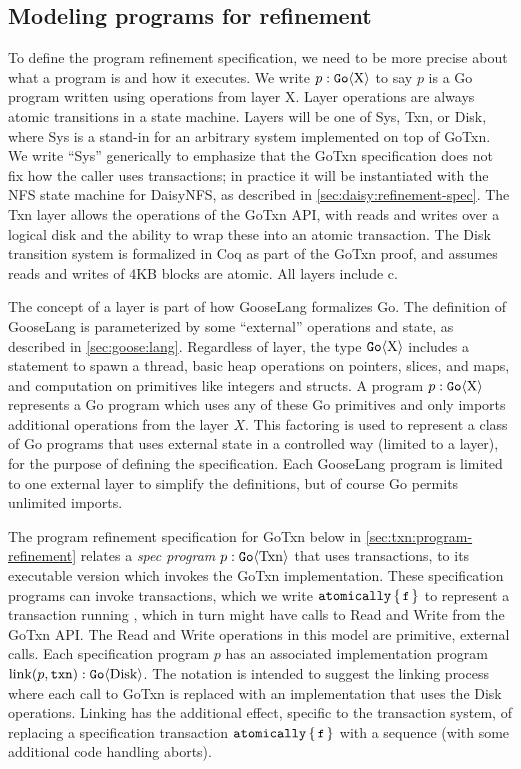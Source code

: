 \subsection{Modeling programs for refinement}%
\label{sec:txn:go-layers}

To define the program refinement specification, we need to be more precise about what a program is
and how it executes. We
write $p : \mathtt{Go}\langle \mathrm{X} \rangle$ to say $p$ is a Go program written using operations
from layer X.
Layer operations are always atomic transitions in a state machine. Layers will
be one of Sys, Txn, or Disk, where Sys is a
stand-in for an arbitrary system implemented on top of GoTxn. We write
``Sys'' generically to emphasize that the GoTxn specification does not fix how the
caller uses transactions; in practice it will be instantiated with the NFS state
machine for DaisyNFS, as described in \cref{sec:daisy:refinement-spec}.
The Txn layer allows the operations of the GoTxn API, with reads and writes over a logical
disk and the ability to wrap these into an atomic transaction. The
Disk transition system is formalized in Coq as part of the GoTxn proof,
and assumes reads and writes of 4KB blocks are atomic. All layers
include c.

The concept of a layer is part of how GooseLang formalizes Go. The definition of
GooseLang is parameterized by some ``external'' operations and state, as
described in \cref{sec:goose:lang}. Regardless of layer, the type
$\mathtt{Go}\langle \mathrm{X} \rangle$ includes a statement to spawn a thread, basic heap operations
on pointers, slices, and maps, and computation on primitives like integers and
structs. A program $p : \mathtt{Go}\langle \mathrm{X} \rangle$ represents a Go program which uses any
of these Go primitives and only imports additional operations from the layer
$X$. This factoring is used to represent a class of Go programs that uses
external state in a controlled way (limited to a layer), for the purpose of
defining the specification. Each GooseLang program is limited to one external
layer to simplify the definitions, but of course Go permits unlimited imports.

The program refinement specification for GoTxn below in
\cref{sec:txn:program-refinement} relates a \emph{spec program}
$p : \mathtt{Go}\langle \mathrm{Txn} \rangle$ that uses transactions, to its executable version
which invokes the GoTxn implementation. These specification programs can invoke
transactions, which we write $\atomically{\cc{f}}$ to represent a transaction
running , which in turn might have calls to Read and Write from the GoTxn
API. The Read and Write operations in this model are primitive, external calls.
Each specification program $p$ has an associated implementation program
$\mathrm{link}(p, \texttt{txn}) : \mathtt{Go}\langle \mathrm{Disk} \rangle$. The notation is intended
to suggest the linking process where each call to GoTxn is replaced with an
implementation that uses the Disk operations. Linking has the additional effect,
specific to the transaction system, of replacing a specification transaction
$\atomically{\cc{f}}$ with a sequence 
(with some additional code handling aborts).

